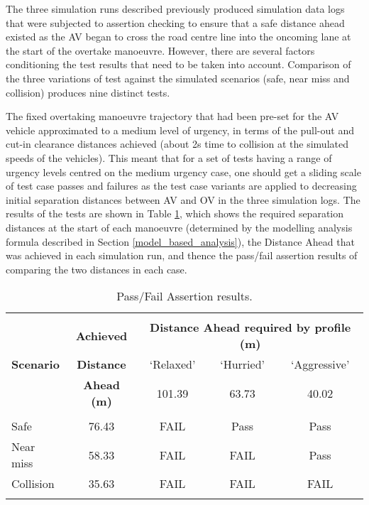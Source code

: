 The three simulation runs described previously produced simulation data logs that were subjected to assertion checking to ensure that a safe distance ahead existed as the AV began to cross the road centre line into the oncoming lane at the start of the overtake manoeuvre. However, there are several factors conditioning the test results that need to be taken into account. 
%
Comparison of the three variations of test against the simulated scenarios (safe, near miss and collision) produces nine distinct tests. 

The fixed overtaking manoeuvre trajectory that had been pre-set for the AV vehicle approximated to a medium level of urgency, in terms of the pull-out and cut-in clearance distances achieved (about 2s time to collision at the simulated speeds of the vehicles). This meant that for a set of tests having a range of urgency levels centred on the medium urgency case, one should get a sliding scale of test case passes and failures as the test case variants are applied to decreasing initial separation distances between AV and OV in the three simulation logs. The results of the tests are shown in Table \ref{Overtaking_Profiles}, which shows the required separation distances at the start of each manoeuvre (determined by the modelling analysis formula described in Section \ref{model_based_analysis}), the Distance Ahead that was achieved in each simulation run, and thence the pass/fail assertion results of comparing the two distances in each case.

\begin{table}[h]
\centering
\begin{tabular}{lcccc}
\hline
\\
\multirow{3}{*}{\textbf{Scenario}} & \textbf{Achieved} & \multicolumn{3}{c}{
\textbf{Distance Ahead required by profile (m)}}\\ %
& \textbf{Distance} & `Relaxed' & `Hurried' & `Aggressive' \\
& \textbf{Ahead (m)} & 101.39 & 63.73 & 40.02 \\
\\
%
Safe & 76.43 & FAIL & Pass & Pass\\
%
Near miss & 58.33 & FAIL & FAIL & Pass\\
%
Collision & 35.63 & FAIL & FAIL & FAIL\\
\\
\hline
\end{tabular}
\caption{Pass/Fail Assertion results.} \label{Overtaking_Profiles}
\end{table}

